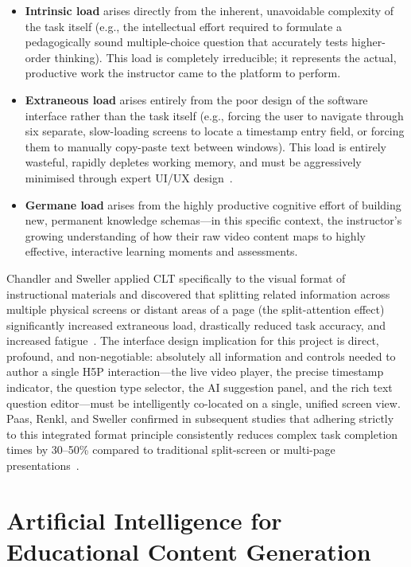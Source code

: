 \begin{itemize}
  \item \textbf{Intrinsic load} arises directly from the inherent, unavoidable complexity of the task itself (e.g., the intellectual effort required to formulate a pedagogically sound multiple-choice question that accurately tests higher-order thinking). This load is completely irreducible; it represents the actual, productive work the instructor came to the platform to perform.
  \item \textbf{Extraneous load} arises entirely from the poor design of the software interface rather than the task itself (e.g., forcing the user to navigate through six separate, slow-loading screens to locate a timestamp entry field, or forcing them to manually copy-paste text between windows). This load is entirely wasteful, rapidly depletes working memory, and must be aggressively minimised through expert UI/UX design~\cite{chandler1991}.
  \item \textbf{Germane load} arises from the highly productive cognitive effort of building new, permanent knowledge schemas---in this specific context, the instructor's growing understanding of how their raw video content maps to highly effective, interactive learning moments and assessments.
\end{itemize}

Chandler and Sweller applied CLT specifically to the visual format of instructional materials and discovered that splitting related information across multiple physical screens or distant areas of a page (the split-attention effect) significantly increased extraneous load, drastically reduced task accuracy, and increased fatigue~\cite{chandler1991}. The interface design implication for this project is direct, profound, and non-negotiable: absolutely all information and controls needed to author a single H5P interaction---the live video player, the precise timestamp indicator, the question type selector, the AI suggestion panel, and the rich text question editor---must be intelligently co-located on a single, unified screen view. Paas, Renkl, and Sweller confirmed in subsequent studies that adhering strictly to this integrated format principle consistently reduces complex task completion times by 30--50\% compared to traditional split-screen or multi-page presentations~\cite{paas2003}.

\section{Artificial Intelligence for Educational Content Generation}

